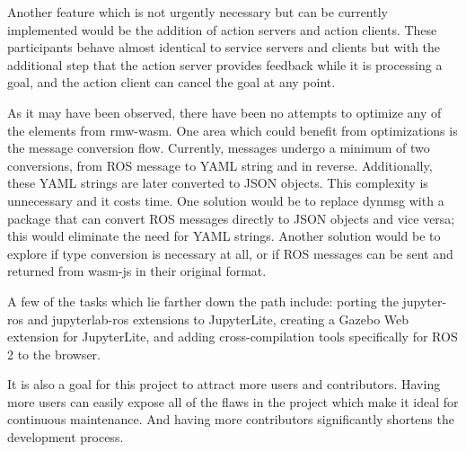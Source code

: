 Another feature which is not urgently necessary but can be currently implemented would be the addition of action servers and action clients. These participants behave almost identical to service servers and clients but with the additional step that the action server provides feedback while it is processing a goal, and the action client can cancel the goal at any point.

As it may have been observed, there have been no attempts to optimize any of the elements from \textsf{rmw-wasm}. One area which could benefit from optimizations is the message conversion flow. Currently, messages undergo a minimum of two conversions, from \ac{ROS} message to \ac{YAML} string and in reverse. Additionally, these \ac{YAML} strings are later converted to \ac{JSON} objects. This complexity is unnecessary and it costs time. One solution would be to replace \textsf{dynmsg} with a package that can convert \ac{ROS} messages directly to \ac{JSON} objects and vice versa; this would eliminate the need for \ac{YAML} strings. Another solution would be to explore if type conversion is necessary at all, or if \ac{ROS} messages can be sent and returned from \textsf{wasm-js} in their original format.

A few of the tasks which lie farther down the path include: porting the \textsf{jupyter-ros} and \textsf{jupyterlab-ros} extensions to JupyterLite, creating a Gazebo Web extension for JupyterLite, and adding cross-compilation tools specifically for \ac{ROS} 2 to the browser.

It is also a goal for this project to attract more users and contributors. Having more users can easily expose all of the flaws in the project which make it ideal for continuous maintenance. And having more contributors significantly shortens the development process.

